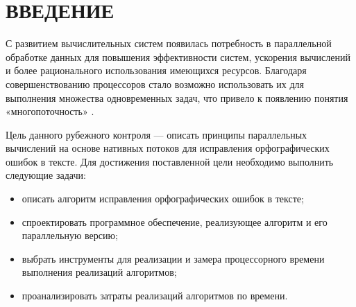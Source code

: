 \chapter*{ВВЕДЕНИЕ}

С развитием вычислительных систем появилась потребность в параллельной обработке данных для повышения эффективности систем, ускорения вычислений и более рационального использования имеющихся ресурсов. 
Благодаря совершенствованию процессоров стало возможно использовать их для выполнения множества одновременных задач, что привело к появлению понятия «многопоточность» \cite{intro}.

Цель данного рубежного контроля --- описать принципы параллельных вычислений на основе нативных потоков для исправления орфографических ошибок в тексте. Для достижения поставленной цели необходимо выполнить следующие задачи:
\begin{itemize}
	\item описать алгоритм исправления орфографических ошибок в тексте;
	\item спроектировать программное обеспечение, реализующее алгоритм и его параллельную версию;
	\item выбрать инструменты для реализации и замера процессорного времени
	выполнения реализаций алгоритмов;
	\item проанализировать затраты реализаций алгоритмов по времени.
\end{itemize}
